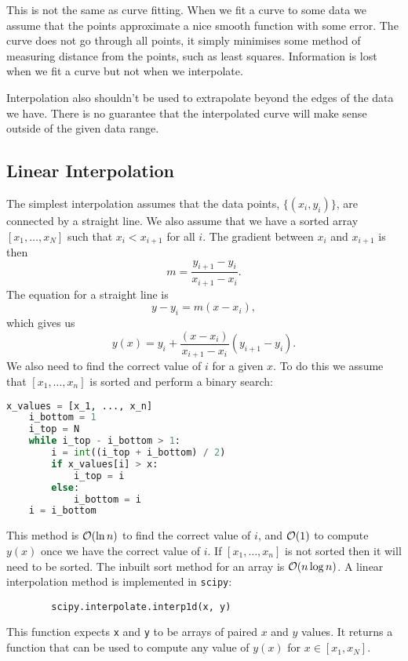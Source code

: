 \documentclass[a4paper]{article}
\begin{document}
    This is not the same as curve fitting.
    When we fit a curve to some data we assume that the points approximate a nice smooth function with some error.
    The curve does not go through all points, it simply minimises some method of measuring distance from the points, such as least squares.
    Information is lost when we fit a curve but not when we interpolate.
    
    Interpolation also shouldn't be used to extrapolate beyond the edges of the data we have.
    There is no guarantee that the interpolated curve will make sense outside of the given data range.
    
    \subsection{Linear Interpolation}
    The simplest interpolation assumes that the data points, \(\{(x_i, y_i)\}\), are connected by a straight line.
    We also assume that we have a sorted array \([x_1, \dotsc, x_N]\)  such that \(x_i < x_{i+1}\) for all \(i\).
    The gradient between \(x_i\) and \(x_{i+1}\) is then
    \[m = \frac{y_{i+1} - y_i}{x_{i+1} - x_i}.\]
    The equation for a straight line is
    \[y - y_i = m(x - x_i),\]
    which gives us
    \[y(x) = y_i + \frac{(x - x_i)}{x_{i+1} - x_i}(y_{i+1} - y_i).\]
    We also need to find the correct value of \(i\) for a given \(x\).
    To do this we assume that \([x_1, \dotsc, x_n]\) is sorted and perform a binary search:
    \begin{lstlisting}[language=python]
    x_values = [x_1, ..., x_n]
    i_bottom = 1
    i_top = N
    while i_top - i_bottom > 1:
        i = int((i_top + i_bottom) / 2)
        if x_values[i] > x:
            i_top = i
        else:
            i_bottom = i
    i = i_bottom
    \end{lstlisting}
    This method is \(\order{\ln n}\) to find the correct value of \(i\), and \(\order{1}\) to compute \(y(x)\) once we have the correct value of \(i\).
    If \([x_1, \dotsc, x_n]\) is not sorted then it will need to be sorted.
    The inbuilt sort method for an array is \(\order{n\log n}\).
    A linear interpolation method is implemented in \lstinline|scipy|:
    \begin{lstlisting}
        scipy.interpolate.interp1d(x, y)
    \end{lstlisting}
    This function expects \lstinline|x| and \lstinline|y| to be arrays of paired \(x\) and \(y\) values.
    It returns a function that can be used to compute any value of \(y(x)\) for \(x\in[x_1, x_N]\).
    
\end{document}
